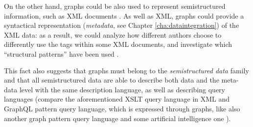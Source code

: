 On the other hand, graphs could be also used to represent semistructured information, such as XML documents \cite{Lassila1999,GutierrezInclusion}. As well as XML, graphs could provide a syntactical representation (\textit{metadata}, see Chapter \ref{cha:dataintegration}) of the XML data: as a result, we could analyze how different authors choose to differently use the tags within some XML documents, and investigate which ``structural patterns'' have been used \cite{IorioHierarchy,BarabucciEARMARK}. 

This fact also suggests that graphs must belong to the \textit{semistructured data} family and that all semistructured data are able to describe both data and the meta-data level with the same description language, as well as describing query languages (compare the aforementioned XSLT query language in XML and GraphQL \cite{GraphLogAggr} pattern query language, which is expressed through graphs, like also another graph pattern query language \cite{n3} and some artificial intelligence one \cite{Goertzel2014}).

\medskip